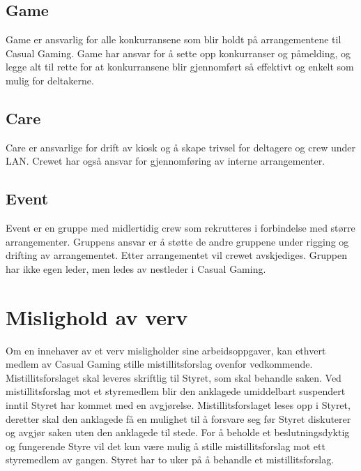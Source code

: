 \subsection{Game}
Game er ansvarlig for alle konkurransene som blir holdt på arrangementene til Casual Gaming. Game har ansvar for å sette opp konkurranser og påmelding, og legge alt til rette for at konkurransene blir gjennomført så effektivt og enkelt som mulig for deltakerne.

\subsection{Care}
Care er ansvarlige for drift av kiosk og å skape trivsel for deltagere og crew under LAN. Crewet har også ansvar for gjennomføring av interne arrangementer.

\subsection{Event}
Event er en gruppe med midlertidig crew som rekrutteres i forbindelse med større arrangementer. Gruppens ansvar er å støtte de andre gruppene under rigging og drifting av arrangementet. Etter arrangementet vil crewet avskjediges. Gruppen har ikke egen leder, men ledes av nestleder i Casual Gaming.

\section{Mislighold av verv}
Om en innehaver av et verv misligholder sine arbeidsoppgaver, kan ethvert medlem av Casual Gaming stille mistillitsforslag ovenfor vedkommende. Mistillitsforslaget skal leveres skriftlig til Styret, som skal behandle saken. Ved mistillitsforslag mot et styremedlem blir den anklagede umiddelbart suspendert inntil Styret har kommet med en avgjørelse. Mistillitsforslaget leses opp i Styret, deretter skal den anklagede få en mulighet til å forsvare seg før Styret diskuterer og avgjør saken uten den anklagede til stede. For å beholde et beslutningsdyktig og fungerende Styre vil det kun være mulig å stille mistillitsforslag mot ett styremedlem av gangen. Styret har to uker på å behandle et mistillitsforslag.

